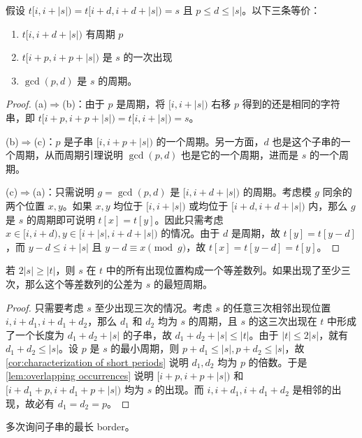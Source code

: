 \begin{lemma}\label{lem:overlapping occurrences}
    假设 $t[i,i+|s|)=t[i+d,i+d+|s|)=s$ 且 $p\le d\le |s|$。以下三条等价：
    \begin{enumerate}
        \item $t[i,i+d+|s|)$ 有周期 $p$
        \item $t[i+p,i+p+|s|)$ 是 $s$ 的一次出现
        \item $\gcd(p,d)$ 是 $s$ 的周期。
    \end{enumerate}
\end{lemma}
\begin{proof}
    (a)$\Rightarrow$(b)：由于 $p$ 是周期，将 $[i,i+|s|)$ 右移 $p$ 得到的还是相同的字符串，即 $t[i+p,i+p+|s|)=t[i,i+|s|)=s$。 

    (b)$\Rightarrow$(c)：$p$ 是子串 $[i,i+p+|s|)$ 的一个周期。另一方面，$d$ 也是这个子串的一个周期，从而周期引理说明 $\gcd(p,d)$ 也是它的一个周期，进而是 $s$ 的一个周期。

    (c)$\Rightarrow$(a)：只需说明 $g=\gcd(p,d)$ 是 $[i,i+d+|s|)$ 的周期。考虑模 $g$ 同余的两个位置 $x,y$。如果 $x,y$ 均位于 $[i,i+|s|)$ 或均位于 $[i+d,i+d+|s|)$ 内，那么 $g$ 是 $s$ 的周期即可说明 $t[x]=t[y]$。因此只需考虑 $x\in [i,i+d),y\in [i+|s|,i+d+|s|)$ 的情况。由于 $d$ 是周期，故 $t[y]=t[y-d]$，而 $y-d\le i+|s|$ 且 $y-d\equiv x\pmod g$，故 $t[x]=t[y-d]=t[y]$。
\end{proof}


\begin{corollary}
    若 $2|s|\ge |t|$，则 $s$ 在 $t$ 中的所有出现位置构成一个等差数列。如果出现了至少三次，那么这个等差数列的公差为 $s$ 的最短周期。
\end{corollary}
\begin{proof}
    只需要考虑 $s$ 至少出现三次的情况。考虑 $s$ 的任意三次相邻出现位置 $i,i+d_1,i+d_1+d_2$，那么 $d_1$ 和 $d_2$ 均为 $s$ 的周期，且 $s$ 的这三次出现在 $t$ 中形成了一个长度为 $d_1+d_2+|s|$ 的子串，故 $d_1+d_2+|s|\le |t|$。由于 $|t|\le 2|s|$，就有 $d_1+d_2\le |s|$。设 $p$ 是 $s$ 的最小周期，则 $p+d_1\le |s|,p+d_2\le |s|$，故\cref{cor:characterization of short periods} 说明 $d_1,d_2$ 均为 $p$ 的倍数。于是\cref{lem:overlapping occurrences} 说明 $[i+p,i+p+|s|)$ 和 $[i+d_1+p,i+d_1+p+|s|)$ 均为 $s$ 的出现。而 $i,i+d_1,i+d_1+d_2$ 是相邻的出现，故必有 $d_1=d_2=p$。
\end{proof}


\begin{example}[基本子串字典]
    多次询问子串的最长 border。
\end{example}


